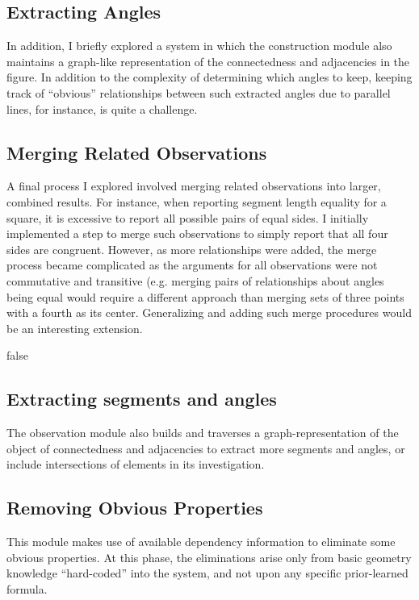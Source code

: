 \subsection{Extracting Angles}

In addition, I briefly explored a system in which the construction
module also maintains a graph-like representation of the connectedness
and adjacencies in the figure. In addition to the complexity of
determining which angles to keep, keeping track of ``obvious''
relationships between such extracted angles due to parallel lines, for
instance, is quite a challenge.

\subsection{Merging Related Observations}

A final process I explored involved merging related observations into
larger, combined results. For instance, when reporting segment length
equality for a square, it is excessive to report all possible pairs of
equal sides. I initially implemented a step to merge such observations
to simply report that all four sides are congruent. However, as more
relationships were added, the merge process became complicated as the
arguments for all observations were not commutative and transitive
(e.g. merging pairs of relationships about angles being equal would
require a different approach than merging sets of three points with a
fourth as its center. Generalizing and adding such merge procedures
would be an interesting extension.


\if false

\subsection{Extracting segments and angles}

The observation module also builds and traverses a
graph-representation of the object of connectedness and adjacencies to
extract more segments and angles, or include intersections of elements
in its investigation.

\subsection{Removing Obvious Properties}

This module makes use of available dependency information to eliminate
some obvious properties. At this phase, the eliminations arise only
from basic geometry knowledge ``hard-coded'' into the system, and not
upon any specific prior-learned formula.

